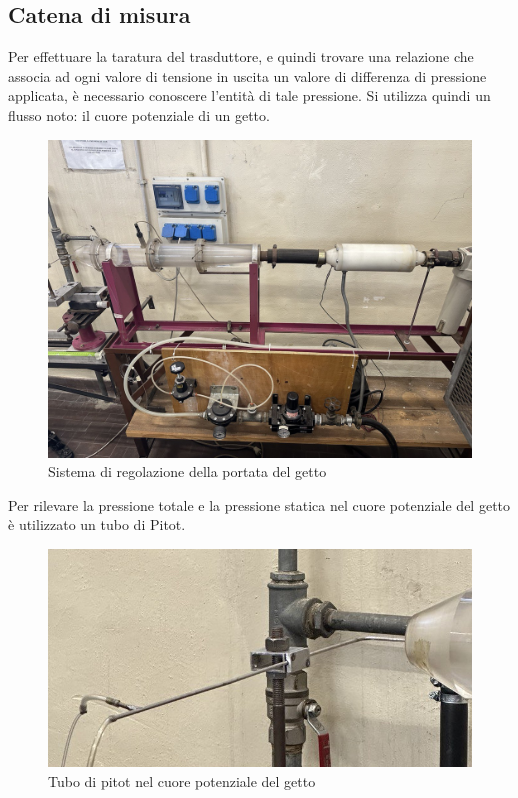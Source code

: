 \subsection{Catena di misura}
Per effettuare la taratura del trasduttore, e quindi trovare una relazione che associa ad ogni valore di tensione in uscita un valore di differenza di pressione applicata, è necessario conoscere l'entità di tale pressione. Si utilizza quindi un flusso noto: il cuore potenziale di un getto.
\begin{figure}[H]
    \centering
    \includegraphics[width=.8\textwidth]{images/1/getto.jpg}
    \caption{Sistema di regolazione della portata del getto}
\end{figure}

\noindent Per rilevare la pressione totale e la pressione statica nel cuore potenziale del getto è utilizzato un tubo di Pitot.
\begin{figure}[H]
    \centering
    \includegraphics[width=.45\textwidth]{images/1/pitot.jpg}
    \caption{Tubo di pitot nel cuore potenziale del getto}
\end{figure}

